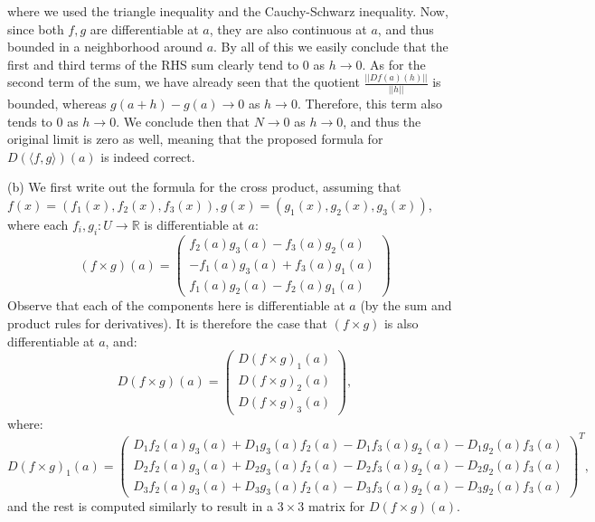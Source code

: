 \begin{solution}
     where we used the triangle inequality and the Cauchy-Schwarz inequality.
     Now, since both $f, g$ are differentiable at $a$, they are also continuous at $a$, and thus bounded in a neighborhood around $a$. 
     By all of this we easily conclude that the first and third terms of the RHS sum clearly tend to 0 as $h \rightarrow 0$.
     As for the second term of the sum, we have already seen that the quotient $\frac{\lvert \lvert Df(a)(h) \rvert \rvert}{\lvert \lvert h \rvert \rvert}$ is bounded, whereas $g(a+h) - g(a) \rightarrow 0$ as $h \rightarrow 0$.
     Therefore, this term also tends to 0 as $h \rightarrow 0$.
     We conclude then that $N \rightarrow 0$ as $h \rightarrow 0$, and thus the original limit is zero as well, meaning that the proposed formula for $D(\langle f, g \rangle)(a)$ is indeed correct.

     (b) We first write out the formula for the cross product, assuming that $f(x) = (f_1(x), f_2(x), f_3(x)), g(x) = (g_1(x), g_2(x), g_3(x))$, where each $f_i, g_i: U \rightarrow \mathbb{R}$ is differentiable at $a$:
     $$(f \times g)(a) = \begin{pmatrix}
         f_2(a)g_3(a) - f_3(a)g_2(a) \\
         -f_1(a)g_3(a) + f_3(a)g_1(a) \\
         f_1(a)g_2(a) - f_2(a)g_1(a)
     \end{pmatrix}$$
     Observe that each of the components here is differentiable at $a$ (by the sum and product rules for derivatives). It is therefore the case that $(f \times g)$ is also differentiable at $a$, and:
    $$D (f \times g)(a) = \begin{pmatrix}
        D (f \times g)_1(a) \\
        D (f \times g)_2 (a) \\
        D (f \times g)_3 (a)
    \end{pmatrix}, $$
    where:
    $$D (f \times g)_1(a) = \begin{pmatrix}
        D_1 f_2(a)g_3(a) + D_1 g_3(a) f_2(a) - D_1 f_3(a) g_2(a) - D_1 g_2(a) f_3(a) \\
        D_2 f_2(a)g_3(a) + D_2 g_3(a) f_2(a) - D_2 f_3(a) g_2(a) - D_2 g_2(a) f_3(a) \\
        D_3 f_2(a)g_3(a) + D_3 g_3(a) f_2(a) - D_3 f_3(a) g_2(a) - D_3 g_2(a) f_3(a)         
    \end{pmatrix}^T,$$
    and the rest is computed similarly to result in a $3 \times 3$ matrix for $D(f \times g)(a)$.
\end{solution}

